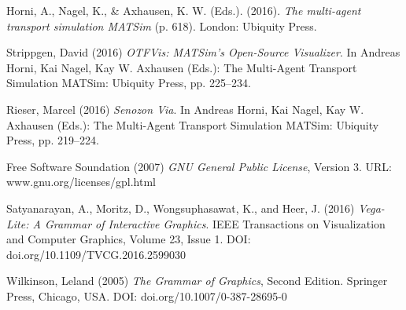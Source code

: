 \documentclass[Afour,sagev,times]{sagej}
\begin{document}
\begin{thebibliography}{99}

Horni, A., Nagel, K., \& Axhausen, K. W. (Eds.). (2016). \textit{The multi-agent transport simulation MATSim} (p. 618). London: Ubiquity Press.

Strippgen, David (2016) \textit{OTFVis: MATSim’s Open-Source Visualizer}. In Andreas Horni, Kai Nagel, Kay W. Axhausen (Eds.): The Multi-Agent Transport Simulation MATSim: Ubiquity Press, pp. 225–234.

Rieser, Marcel (2016) \textit{Senozon Via}. In Andreas Horni, Kai Nagel, Kay W. Axhausen (Eds.): The Multi-Agent Transport Simulation MATSim: Ubiquity Press, pp. 219–224.

Free Software Soundation (2007) \textit{GNU General Public License}, Version 3.
URL: www.gnu.org/licenses/gpl.html

Satyanarayan, A., Moritz, D., Wongsuphasawat, K., and Heer, J. (2016) \textit{Vega-Lite: A Grammar of Interactive Graphics}. IEEE Transactions on Visualization and Computer Graphics, Volume 23, Issue 1. DOI: doi.org/10.1109/TVCG.2016.2599030

Wilkinson, Leland (2005) \textit{The Grammar of Graphics}, Second Edition. Springer Press, Chicago, USA. DOI: doi.org/10.1007/0-387-28695-0

\end{thebibliography}
\end{document}
